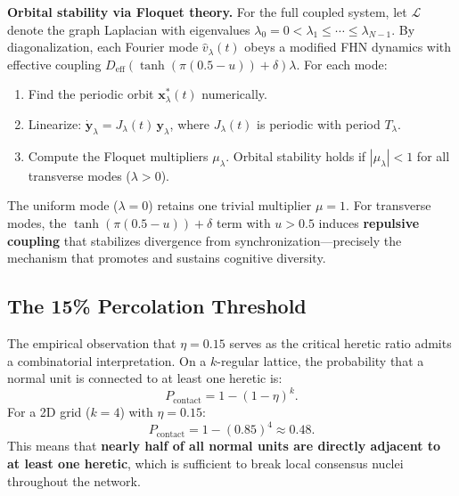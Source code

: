 \documentclass[11pt]{article}
\begin{document}
\textbf{Orbital stability via Floquet theory.} For the full coupled system, let $\mathcal{L}$ denote the graph Laplacian with eigenvalues $\lambda_0 = 0 < \lambda_1 \le \cdots \le \lambda_{N-1}$. By diagonalization, each Fourier mode $\hat{v}_\lambda(t)$ obeys a modified FHN dynamics with effective coupling $D_{\text{eff}}(\tanh(\pi(0.5-u)) + \delta)\lambda$. For each mode:
\begin{enumerate}
    \item Find the periodic orbit $\mathbf{x}^*_\lambda(t)$ numerically.
    \item Linearize: $\dot{\mathbf{y}}_\lambda = J_\lambda(t)\,\mathbf{y}_\lambda$, where $J_\lambda(t)$ is periodic with period $T_\lambda$.
    \item Compute the Floquet multipliers $\mu_\lambda$. Orbital stability holds if $|\mu_\lambda| < 1$ for all transverse modes ($\lambda > 0$).
\end{enumerate}
The uniform mode ($\lambda = 0$) retains one trivial multiplier $\mu = 1$. For transverse modes, the $\tanh(\pi(0.5-u)) + \delta$ term with $u > 0.5$ induces \textbf{repulsive coupling} that stabilizes divergence from synchronization---precisely the mechanism that promotes and sustains cognitive diversity.

\subsection{The 15\% Percolation Threshold}

The empirical observation that $\eta = 0.15$ serves as the critical heretic ratio admits a combinatorial interpretation. On a $k$-regular lattice, the probability that a normal unit is connected to at least one heretic is:
\begin{equation}
    P_{\text{contact}} = 1 - (1-\eta)^k.
    \label{eq:percolation}
\end{equation}
For a 2D grid ($k=4$) with $\eta = 0.15$:
\[
P_{\text{contact}} = 1 - (0.85)^4 \approx 0.48.
\]
This means that \textbf{nearly half of all normal units are directly adjacent to at least one heretic}, which is sufficient to break local consensus nuclei throughout the network.
\end{document}
